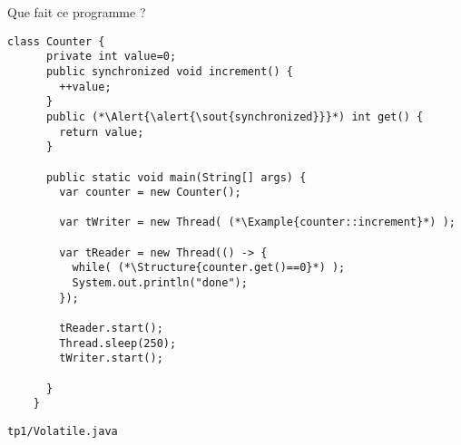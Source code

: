 
\begingroup

\begin{frame}[fragile]{Que fait ce programme ?}

  \begin{lstlisting}[gobble=4]
    class Counter {
      private int value=0;
      public synchronized void increment() {
        ++value;
      }
      public (*\Alert{\alert{\sout{synchronized}}}*) int get() {
        return value;
      }

      public static void main(String[] args) {
        var counter = new Counter();
        
        var tWriter = new Thread( (*\Example{counter::increment}*) );

        var tReader = new Thread(() -> {
          while( (*\Structure{counter.get()==0}*) );
          System.out.println("done");
        });
        
        tReader.start();
        Thread.sleep(250);
        tWriter.start();
        
      }
    }
  \end{lstlisting}
  
  \begin{citing}
    \jitem \lstinline{tp1/Volatile.java}
  \end{citing}
\end{frame}

\endgroup
\endinput
